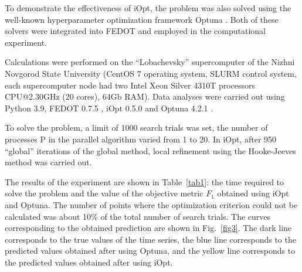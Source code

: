 \documentclass[runningheads]{llncs}
\begin{document}
To demonstrate the effectiveness of iOpt, the problem was also solved using the well-known hyperparameter optimization framework Optuna \cite{OptunaURL,optuna}. Both of these solvers were integrated into FEDOT and employed in the computational experiment.

Calculations were performed on the ``Lobachevsky'' supercomputer of the Nizhni Novgorod State University (CentOS 7 operating system, SLURM control system, each supercomputer node had two Intel Xeon Silver 4310T processors CPU@2.30GHz (20 cores), 64Gb RAM). Data analyses were carried out using Python 3.9, FEDOT 0.7.5 \cite{FEDOT}, iOpt 0.5.0 \cite{iOptURL} and Optuna 4.2.1 \cite{OptunaURL}.

To solve the problem, a limit of 1000 search trials was set, the number of processes P in the parallel algorithm varied from 1 to 20. In iOpt, after 950 ``global'' iterations of the global method, local refinement using the Hooke-Jeeves method was carried out.  %

%
%
%
%
The results of the experiment are shown in Table~\ref{tab1}: the time required to solve the problem and the value of the objective metric $F_1$ obtained using iOpt and Optuna. The number of points where the optimization criterion could not be calculated was about 10\% of the total number of search trials. The curves corresponding to the obtained prediction are shown in Fig.~\ref{fig3}. The dark line corresponds to the true values of the time series, the blue line corresponds to the predicted values obtained after using Optuna, and the yellow line corresponds to the predicted values obtained after using iOpt. 
\end{document}
